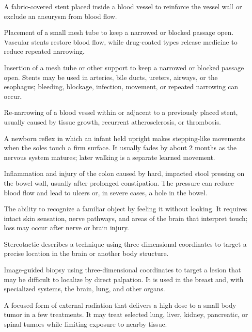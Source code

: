  A fabric-covered stent placed inside a blood vessel to reinforce the vessel wall or exclude an aneurysm from blood flow.

 Placement of a small mesh tube to keep a narrowed or blocked passage open. Vascular stents restore blood flow, while drug-coated types release medicine to reduce repeated narrowing.

 Insertion of a mesh tube or other support to keep a narrowed or blocked passage open. Stents may be used in arteries, bile ducts, ureters, airways, or the esophagus; bleeding, blockage, infection, movement, or repeated narrowing can occur.

 Re-narrowing of a blood vessel within or adjacent to a previously placed stent, usually caused by tissue growth, recurrent atherosclerosis, or thrombosis.

 A newborn reflex in which an infant held upright makes stepping-like movements when the soles touch a firm surface. It usually fades by about 2 months as the nervous system matures; later walking is a separate learned movement.

 Inflammation and injury of the colon caused by hard, impacted stool pressing on the bowel wall, usually after prolonged constipation. The pressure can reduce blood flow and lead to ulcers or, in severe cases, a hole in the bowel.

 The ability to recognize a familiar object by feeling it without looking. It requires intact skin sensation, nerve pathways, and areas of the brain that interpret touch; loss may occur after nerve or brain injury.

 Stereotactic describes a technique using three-dimensional coordinates to target a precise location in the brain or another body structure.

 Image-guided biopsy using three-dimensional coordinates to target a lesion that may be difficult to localize by direct palpation. It is used in the breast and, with specialized systems, the brain, lung, and other organs.

 A focused form of external radiation that delivers a high dose to a small body tumor in a few treatments. It may treat selected lung, liver, kidney, pancreatic, or spinal tumors while limiting exposure to nearby tissue.

